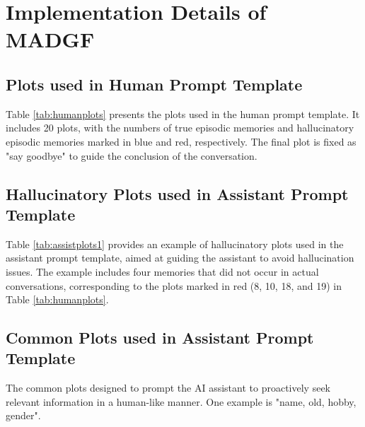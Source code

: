 \appendix

\section{Implementation Details of MADGF}

\subsection{Plots used in Human Prompt Template}
\label{sec:plotsforhuman}

Table \ref{tab:humanplots} presents the plots used in the human prompt template. It includes 20 plots, with the numbers of \colorbox{wkblue}{true episodic memories} and  \colorbox{wkred}{hallucinatory episodic memories} marked in blue and red, respectively. The final plot is fixed as "say goodbye" to guide the conclusion of the conversation.




\subsection{Hallucinatory Plots used in Assistant Prompt Template}
\label{sec:hplotsforassist}

Table \ref{tab:assistplots1} provides an example of hallucinatory plots used in the assistant prompt template, aimed at guiding the assistant to avoid hallucination issues. The example includes four memories that did not occur in actual conversations, corresponding to the plots marked in red (\colorbox{wkred}{8, 10, 18}, and \colorbox{wkred}{19}) in Table \ref{tab:humanplots}.




\subsection{Common Plots used in Assistant Prompt Template}
\label{sec:cplotsforassist}

The common plots designed to prompt the AI assistant to proactively seek relevant information in a human-like manner. One example is "name, old, hobby, gender".


% 



